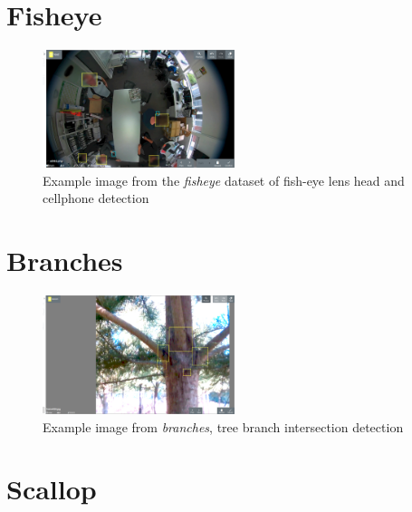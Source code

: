 \section{Fisheye}

\begin{figure}[h]
  \includegraphics[width=0.5\textwidth]{figures/annotation/screenshots/victor.png}
  \caption{Example image from the \emph{fisheye} dataset of fish-eye lens head and cellphone detection }
\end{figure}

\section{Branches}


\begin{figure}[h]
  \includegraphics[width=0.5\textwidth]{figures/annotation/screenshots/branches3.png}
  \caption{Example image from \emph{branches}, tree branch intersection detection}
  
\end{figure}


\section {Scallop}

